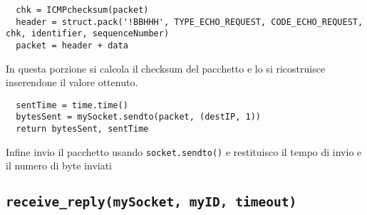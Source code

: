 \documentclass[a4paper,12pt]{report}
\begin{document}
\begin{verbatim}
  chk = ICMPchecksum(packet)
  header = struct.pack('!BBHHH', TYPE_ECHO_REQUEST, CODE_ECHO_REQUEST, chk, identifier, sequenceNumber)
  packet = header + data
\end{verbatim}
In questa porzione si calcola il checksum del pacchetto e lo si ricostruisce inserendone il valore ottenuto.
\begin{verbatim}
  sentTime = time.time()
  bytesSent = mySocket.sendto(packet, (destIP, 1))
  return bytesSent, sentTime
\end{verbatim}
Infine invio il pacchetto usando \texttt{socket.sendto()} e restituisco il tempo di invio e il numero di byte inviati
\subsection*{\texttt{receive\_reply(mySocket, myID, timeout)}}
\end{document}
